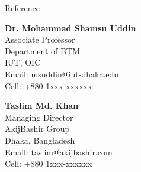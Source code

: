 \documentclass[
	a4paper,
	12pt,
]{resume}
\begin{document}
\begin{rSection}{Reference}

	\noindent
	\begin{minipage}[t]{0.48\linewidth}
		\textbf{Dr. Mohammad Shamsu Uddin} \\
		Associate Professor                \\
		Department of BTM                  \\
		IUT, OIC                           \\
		Email: msuddin@iut-dhaka.edu       \\
		Cell: +880 1xxx-xxxxxx
	\end{minipage}
	\hfill
	\begin{minipage}[t]{0.33\linewidth}
		\textbf{Taslim Md. Khan}     \\
		Managing Director            \\
		AkijBashir Group             \\
		Dhaka, Bangladesh            \\
		Email: taslim@akijbashir.com \\
		Cell: +880 1xxx-xxxxxx
	\end{minipage}

\end{rSection}
\end{document}
